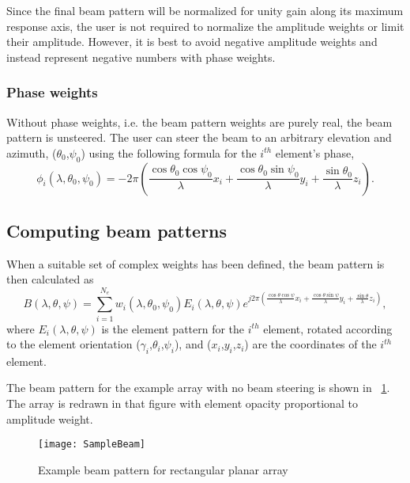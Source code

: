 Since the final beam pattern will be normalized for unity gain along its maximum response axis, the user is not required to normalize the amplitude weights or limit their amplitude. However, it is best to avoid negative amplitude weights and instead represent negative numbers with phase weights.

\subsubsection{Phase weights}

Without phase weights, i.e. the beam pattern weights are purely real, the beam pattern is unsteered. The user can steer the beam to an arbitrary elevation and azimuth, ($\theta_0$,$\psi_0$) using the following formula for the $i^{th}$ element's phase,
\begin{equation}
\phi_i(\lambda,\theta_0,\psi_0) = -2\pi\left(\frac{\cos\theta_0\cos\psi_0}{\lambda}x_i + \frac{\cos\theta_0\sin\psi_0}{\lambda}y_i + \frac{\sin\theta_0}{\lambda}z_i \right).
\end{equation}

\subsection{Computing beam patterns}

When a suitable set of complex weights has been defined, the beam pattern is then calculated as
\begin{equation}
B(\lambda,\theta,\psi) = \sum_{i=1}^{N_e} w_i(\lambda,\theta_0,\psi_0)E_i(\lambda,\theta,\psi)e^{j2\pi\left(\frac{\cos\theta\cos\psi}{\lambda}x_i + \frac{\cos\theta\sin\psi}{\lambda}y_i + \frac{\sin\theta}{\lambda}z_i\right)},
\end{equation}
where $E_i(\lambda,\theta,\psi)$ is the element pattern for the $i^{th}$ element, rotated according to the element orientation ($\gamma_i$,$\theta_i$,$\psi_i$), and ($x_i$,$y_i$,$z_i$) are the coordinates of the $i^{th}$ element.

The beam pattern for the example array with no beam steering is shown in \figname~\ref{fig:SampleBeam}. The array is redrawn in that figure with element opacity proportional to amplitude weight.

\begin{figure}[!ht]
\begin{center}
\texttt{[image: SampleBeam]}
\caption{\label{fig:SampleBeam}Example beam pattern for rectangular planar array}
\end{center}
\end{figure}